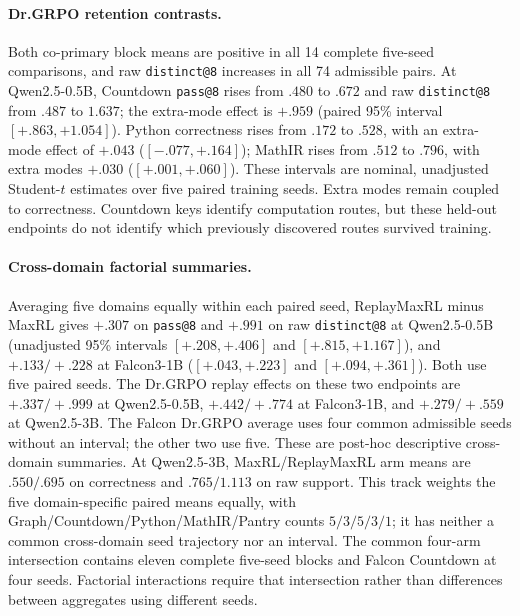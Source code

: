 
\paragraph{Dr.GRPO retention contrasts.}
\label{app:retention-numerical-detail}
Both co-primary block means are positive in all 14 complete five-seed
comparisons, and raw \texttt{distinct@8} increases in all 74 admissible pairs.
At Qwen2.5-0.5B, Countdown \texttt{pass@8} rises from $.480$ to $.672$ and
raw \texttt{distinct@8} from $.487$ to $1.637$; the extra-mode effect is
$+.959$ (paired 95\% interval $[+.863,+1.054]$). Python correctness rises
from $.172$ to $.528$, with an extra-mode effect of $+.043$
($[-.077,+.164]$); MathIR rises from $.512$ to $.796$, with extra modes
$+.030$ ($[+.001,+.060]$). These intervals are nominal, unadjusted
Student-$t$ estimates over five paired training seeds. Extra modes remain
coupled to correctness. Countdown keys identify computation routes, but
these held-out endpoints do not identify which previously discovered
routes survived training.

\paragraph{Cross-domain factorial summaries.}
\label{app:factorial-numerical-detail}
Averaging five domains equally within each paired seed, ReplayMaxRL minus
MaxRL gives $+.307$ on \texttt{pass@8} and $+.991$ on raw
\texttt{distinct@8} at Qwen2.5-0.5B (unadjusted 95\% intervals
$[+.208,+.406]$ and $[+.815,+1.167]$), and $+.133/+.228$ at Falcon3-1B
($[+.043,+.223]$ and $[+.094,+.361]$). Both use five paired seeds.
The Dr.GRPO replay effects on these two endpoints are $+.337/+.999$ at
Qwen2.5-0.5B, $+.442/+.774$ at Falcon3-1B, and $+.279/+.559$ at
Qwen2.5-3B. The Falcon Dr.GRPO average uses four common admissible seeds
without an interval; the other two use five. These are post-hoc descriptive
cross-domain summaries. At Qwen2.5-3B, MaxRL/ReplayMaxRL arm means are
$.550/.695$ on correctness and $.765/1.113$ on raw support. This track
weights the five domain-specific paired means equally, with
Graph/Countdown/Python/MathIR/Pantry counts $5/3/5/3/1$; it has neither a
common cross-domain seed trajectory nor an interval. The common four-arm
intersection contains eleven complete five-seed blocks and Falcon Countdown
at four seeds. Factorial interactions require that intersection rather than
differences between aggregates using different seeds.

